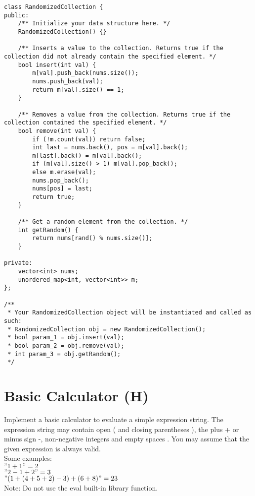 \begin{lstlisting}
class RandomizedCollection {
public:
    /** Initialize your data structure here. */
    RandomizedCollection() {}
    
    /** Inserts a value to the collection. Returns true if the collection did not already contain the specified element. */
    bool insert(int val) {
        m[val].push_back(nums.size());
        nums.push_back(val);
        return m[val].size() == 1;
    }
    
    /** Removes a value from the collection. Returns true if the collection contained the specified element. */
    bool remove(int val) {
        if (!m.count(val)) return false;
        int last = nums.back(), pos = m[val].back(); 
        m[last].back() = m[val].back();
        if (m[val].size() > 1) m[val].pop_back();
        else m.erase(val);
        nums.pop_back();
        nums[pos] = last;
        return true;
    }
    
    /** Get a random element from the collection. */
    int getRandom() {
        return nums[rand() % nums.size()];
    }
    
private:
    vector<int> nums;
    unordered_map<int, vector<int>> m;
};

/**
 * Your RandomizedCollection object will be instantiated and called as such:
 * RandomizedCollection obj = new RandomizedCollection();
 * bool param_1 = obj.insert(val);
 * bool param_2 = obj.remove(val);
 * int param_3 = obj.getRandom();
 */
\end{lstlisting}


\section{Basic Calculator (H)}
Implement a basic calculator to evaluate a simple expression string. The expression string may contain open ( and closing parentheses ), the plus + or minus sign -, non-negative integers and empty spaces . You may assume that the given expression is always valid.\\

Some examples:\\
$"1 + 1" = 2$\\
$" 2-1 + 2 " = 3$\\
$"(1+(4+5+2)-3)+(6+8)" = 23$\\

Note: Do not use the eval built-in library function. \\

